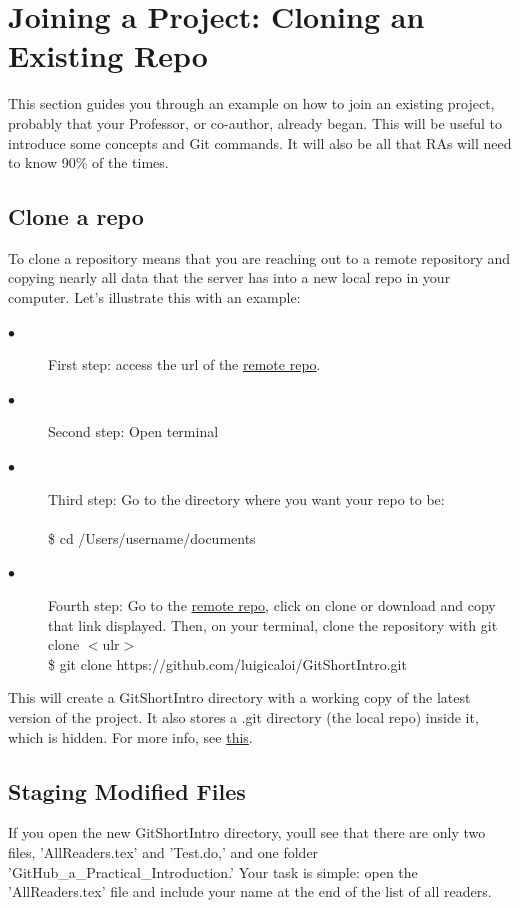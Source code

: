 \documentclass[12pt]{article}
\begin{document}
\section{Joining a Project: Cloning an Existing Repo}

    This section guides you through an example on how to join an existing project, probably that your Professor, or co-author, already began. This will be useful to introduce some concepts and Git commands. It will also be all that RAs will need to know 90\% of the times.
    
\subsection{Clone a repo}

    To clone a repository means that you are reaching out to a remote repository and copying nearly all data that the server has into a new local repo in your computer. Let's illustrate this with an example:
    \begin{description}
    \item[$\bullet$] First step: access the url of the \href{https://github.com/luigicaloi/GitShortIntro}{remote repo}.
    \item[$\bullet$] Second step: Open terminal
    \item[$\bullet$] Third step: Go to the directory where you want your repo to be: \\ \\
    \indent \$ cd /Users/username/documents 
    
    \item[$\bullet$] Fourth step: Go to the \href{https://github.com/luigicaloi/GitShortIntro}{remote repo}, click on clone or download and copy that link displayed. Then, on your terminal, clone the repository with git clone $<$ulr$>$   \\
    
    \indent \$ git clone  https://github.com/luigicaloi/GitShortIntro.git
    \vspace{0.1 in}
    \end{description}
    This will create a GitShortIntro directory with a working copy of the latest version of the project. It also stores a .git directory (the local repo) inside it, which is hidden. For more info, see \href{https://help.github.com/articles/cloning-a-repository/}{this}.
    
    \subsection{Staging Modified Files}
    If you open the new GitShortIntro directory, you\textquotesingle ll see that there are only two files, 'AllReaders.tex' and 'Test.do,' and one folder 'GitHub\_a\_Practical\_Introduction.' Your task is simple: open the 'AllReaders.tex' file and include your name at the end of the list of all readers.
    
\end{document}
